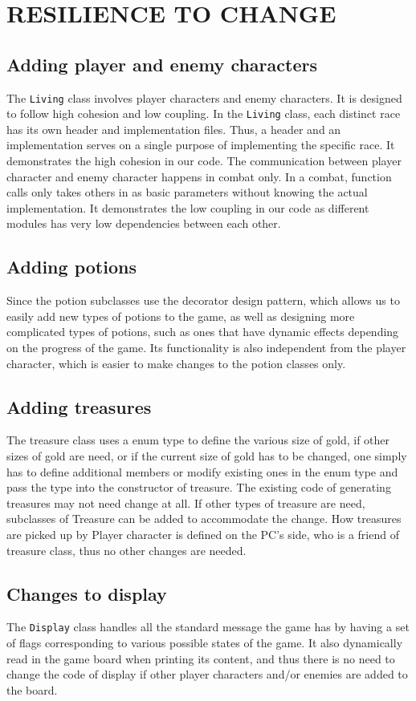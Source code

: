 \documentclass[11pt]{article}
\theoremstyle{plain} \newtheorem{theorem*}{Theorem}[subsection]
\begin{document}
\newpage
\section{RESILIENCE TO CHANGE}
\subsection{Adding player and enemy characters}
The \texttt{Living} class involves player characters and enemy characters. 
It is designed to follow high cohesion and low coupling. 
In the \texttt{Living} class, each distinct race has its own header and 
implementation files. Thus, a header and an
implementation serves on a single purpose of implementing the specific race. It
demonstrates the high cohesion in our code. The communication between player
character and enemy character happens in combat only. In a combat, function
calls only takes others in as basic parameters without knowing the actual
implementation. It demonstrates the low coupling in our code as different
modules has very low dependencies between each other. 

\subsection{Adding potions}
Since the potion subclasses use the decorator design pattern, which allows us
to easily add new types of potions to the game, as well as designing more
complicated types of potions, such as ones that have dynamic effects depending
on the progress of the game. Its functionality is also independent from the
player character, which is easier to make changes to the potion classes only. 

\subsection{Adding treasures}
The treasure class uses a enum type to define the various size of gold, if
other sizes of gold are need, or if the current size of gold has to be changed,
one simply has to define additional members or modify existing ones in the enum
type and pass the type into the constructor of treasure. The existing code of
generating treasures may not need change at all. If other types of treasure are
need, subclasses of Treasure can be added to accommodate the change. How
treasures are picked up by Player character is defined on the PC’s side, who is
a friend of treasure class, thus no other changes are needed. 

\subsection{Changes to display}
The \texttt{Display} class handles all the standard message the game has by 
having a set
of flags corresponding to various possible states of the game. It also
dynamically read in the game board when printing its content, and thus there is
no need to change the code of display if other player characters and/or enemies
are added to the board.  
\end{document}
